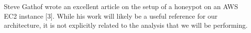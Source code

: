 Steve Gathof wrote an excellent article on the setup of a honeypot on an AWS EC2 instance [3]. While his work will likely be a useful reference for our architecture, it is not explicitly related to the analysis that we will be performing. 